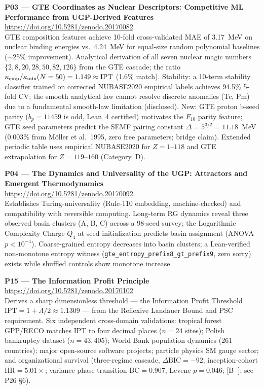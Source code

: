 \documentclass[11pt]{article}
\begin{document}
\medskip
\noindent\textbf{P03 — GTE Coordinates as Nuclear Descriptors: Competitive ML
Performance from UGP-Derived Features}~\cite{spivack2025nuclear_physics}\\
\url{https://doi.org/10.5281/zenodo.20170082}\\
GTE composition features achieve 10-fold cross-validated MAE of 3.17~MeV on
nuclear binding energies vs.\ 4.24~MeV for equal-size random polynomial baselines
($\sim$25\% improvement).  Analytical derivation of all seven nuclear magic numbers
$\{2,8,20,28,50,82,126\}$ from the GTE cascade; the ratio
$\kappa_{\rm emp}/\kappa_{\rm min}(N=50) = 1.149 \approx \text{IPT}$ (1.6\% match).
Stability: a 10-term stability classifier trained on corrected NUBASE2020 empirical
labels achieves 94.5\% 5-fold CV; the smooth analytical law cannot resolve discrete
anomalies (Tc, Pm) due to a fundamental smooth-law limitation (disclosed).
New: GTE proton b-seed parity ($b_p=11459$ is odd, Lean~4 certified) motivates the
$F_{10}$ parity feature; GTE seed parameters predict the SEMF pairing constant
$\Delta = 5^{3/2} = 11.18$~MeV ($0.003\%$ from M\"{o}ller et al.\ 1995, zero free
parameters; bridge claim). Extended periodic table uses empirical NUBASE2020 for
$Z=1$--$118$ and GTE extrapolation for $Z=119$--$160$ (Category~D).

\medskip
\noindent\textbf{P04 — The Dynamics and Universality of the UGP: Attractors
and Emergent Thermodynamics}~\cite{SpivackUGPDynamics}\\
\url{https://doi.org/10.5281/zenodo.20170092}\\
Establishes Turing-universality (Rule-110 embedding, machine-checked) and
compatibility with reversible computing.  Long-term RG dynamics reveal three
observed basin clusters (A, B, C) across a 98-seed survey; the Logarithmic
Complexity Charge $Q_4$ at seed initialization predicts basin assignment
(ANOVA $p < 10^{-4}$).  Coarse-grained entropy decreases into basin clusters;
a Lean-verified non-monotone entropy witness (\texttt{gte\_entropy\_prefix8\_gt\_prefix9},
zero sorry) exists while shuffled controls show monotone increase.

\medskip
\noindent\textbf{P15 — The Information Profit Principle}~\cite{SpivackIPT}\\
\url{https://doi.org/10.5281/zenodo.20170102}\\
Derives a sharp dimensionless threshold --- the Information Profit Threshold
$\text{IPT} = 1 + \Lambda/2 \approx 1.1309$ --- from the Reflexive Landauer
Bound and PSC requirement.  Six independent cross-domain validations: tropical
forest GPP/RECO matches IPT to four decimal places ($n=24$ sites); Polish
bankruptcy dataset ($n=43,405$); World Bank population dynamics (261 countries);
major open-source software projects; particle physics SM gauge sector; and
organizational survival (three-regime cascade, $\Delta\mathrm{BIC}=-92$; inception-cohort HR$=5.01\times$; variance phase transition BC$=0.907$, Levene $p=0.046$; [B$^-$]; see P26 §6).
\end{document}

